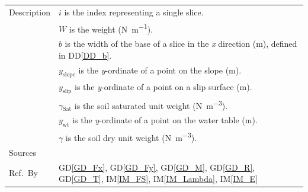 \documentclass[12pt]{article}
\newcommand{\colAwidth}{0.13\textwidth}
\newcommand{\colBwidth}{0.82\textwidth}
\newcommand{\iref}[1]{IM\ref{#1}}
\newcommand{\ddref}[1]{DD\ref{#1}}
\newcommand{\dref}[1]{GD\ref{#1}}
\begin{document}
\begin{minipage}{\textwidth}
\begin{tabular}{| p{\colAwidth} | p{\colBwidth} |}
\hline Description &$i$ is the index representing a single slice.\\
&$W$ is the weight (\si{\newton\per\meter}).\\
&$b$ is the width of the base of a slice in the \textit{x} direction 
(\si{\meter}), defined in \ddref{DD_b}.\\
&${y_{\text{slope}}}$ is the \textit{y}-ordinate of a point on the slope 
(\si{\meter}).\\
&${y_{\text{slip}}}$ is the \textit{y}-ordinate of a point on a slip surface 
(\si{\meter}).\\
&${\gamma{}_{\text{Sat}}}$ is the soil saturated unit weight 
(\si{\newton\per\meter\cubed}).\\
&${y_{\text{wt}}}$ is the \textit{y}-ordinate of a point on the water table 
(\si{\meter}).\\
&$\gamma{}$ is the soil dry unit weight (\si{\newton\per\meter\cubed}).
\\

\hline Sources& \cite{FredlundKrahn}\\

\hline Ref.\ By & \dref{GD_Fx}, \dref{GD_Fy}, \dref{GD_M}, \dref{GD_R}, 
\dref{GD_T}, \iref{IM_FS}, \iref{IM_Lambda}, \iref{IM_E}\\

\hline
\end{tabular}
\end{minipage}\\


~\newline

\end{document}
